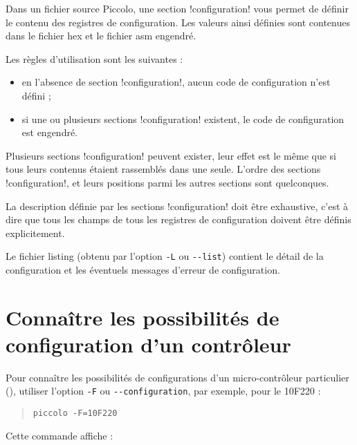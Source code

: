 
\cleardoublepage


\thispagestyle{empty}

Dans un fichier source Piccolo, une section \pic!configuration! vous permet de définir le contenu des registres de configuration. Les valeurs ainsi définies sont contenues dans le fichier hex et le fichier asm engendré.


Les règles d'utilisation sont les suivantes :
\begin{itemize}
  \item en l’absence de section \pic!configuration!, aucun code de configuration n’est défini ;
  \item si une ou plusieurs sections \pic!configuration! existent, le code de configuration est engendré.
\end{itemize}

Plusieurs sections \pic!configuration! peuvent exister, leur effet est le même que si tous leurs contenus étaient rassemblés dans une seule. L’ordre des sections \pic!configuration!, et leurs positions parmi les autres sections sont quelconques.

La description définie par les sections \pic!configuration! doit être exhaustive, c’est à dire que tous les champs de tous les registres de configuration doivent être définis explicitement.

Le fichier listing (obtenu par l’option \texttt{-L} ou \texttt{-{}-list}) contient le détail de la configuration et les éventuels messages d’erreur de configuration.




\section{Connaître les possibilités de configuration d'un contrôleur}

Pour connaître les possibilités de configurations d’un micro-contrôleur particulier (), utiliser l’option \texttt{-F} ou \texttt{-{}-configuration}, par exemple, pour le 10F220 :
\begin{quote}
\texttt{piccolo -F=10F220}
\end{quote}

Cette commande affiche :


